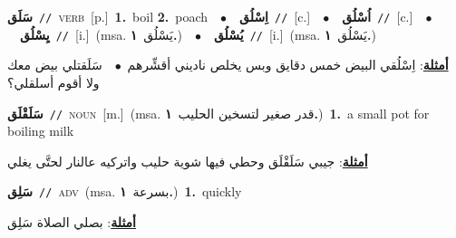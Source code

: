 \documentclass[10pt,a4paper,twoside]{article} %
\begin{document}
\begin{multicols}{2}
{\setlength\topsep{0pt}\textbf{\foreignlanguage{arabic}{سَلَق}}\ {\color{gray}\texttt{//}\color{black}}\ \textsc{verb}\ [p.]\ \textbf{1.}~boil  \textbf{2.}~poach\ \ $\bullet$\ \ \setlength\topsep{0pt}\textbf{\foreignlanguage{arabic}{اِسْلُق}}\ {\color{gray}\texttt{//}\color{black}}\ [c.]\ \ $\bullet$\ \ \setlength\topsep{0pt}\textbf{\foreignlanguage{arabic}{اُسْلُق}}\ {\color{gray}\texttt{//}\color{black}}\ [c.]\ \ $\bullet$\ \ \setlength\topsep{0pt}\textbf{\foreignlanguage{arabic}{يِسْلُق}}\ {\color{gray}\texttt{//}\color{black}}\ [i.]\ \color{gray}(msa. \foreignlanguage{arabic}{يَسْلُق}~\foreignlanguage{arabic}{\textbf{١.}})\color{black}\ \ $\bullet$\ \ \setlength\topsep{0pt}\textbf{\foreignlanguage{arabic}{يُسْلُق}}\ {\color{gray}\texttt{//}\color{black}}\ [i.]\ \color{gray}(msa. \foreignlanguage{arabic}{يَسْلُق}~\foreignlanguage{arabic}{\textbf{١.}})\color{black}\  \begin{flushright}\color{gray}\foreignlanguage{arabic}{\textbf{\underline{\foreignlanguage{arabic}{أمثلة}}}: اِسْلُقي البيض خمس دقايق وبس يخلص ناديني أقشِّرهم\ $\bullet$\ \  سَلَقتلي بيض معك ولا أقوم أسلقلي؟}\end{flushright}\color{black}} \vspace{2mm}

{\setlength\topsep{0pt}\textbf{\foreignlanguage{arabic}{سَلَقْلَق}}\ {\color{gray}\texttt{//}\color{black}}\ \textsc{noun}\ [m.]\ \color{gray}(msa. \foreignlanguage{arabic}{قدر صغير لتسخين الحليب}~\foreignlanguage{arabic}{\textbf{١.}})\color{black}\ \textbf{1.}~a small pot for boiling milk\  \begin{flushright}\color{gray}\foreignlanguage{arabic}{\textbf{\underline{\foreignlanguage{arabic}{أمثلة}}}: جيبي سَلَقْلَق وحطي فيها شوية حليب واتركيه عالنار لحتَّى يغلي}\end{flushright}\color{black}} \vspace{2mm}

{\setlength\topsep{0pt}\textbf{\foreignlanguage{arabic}{سَلِق}}\ {\color{gray}\texttt{//}\color{black}}\ \textsc{adv}\ \color{gray}(msa. \foreignlanguage{arabic}{بسرعة}~\foreignlanguage{arabic}{\textbf{١.}})\color{black}\ \textbf{1.}~quickly\  \begin{flushright}\color{gray}\foreignlanguage{arabic}{\textbf{\underline{\foreignlanguage{arabic}{أمثلة}}}: بصلي الصلاة سَلِق}\end{flushright}\color{black}} \vspace{2mm}


\end{multicols}
\end{document}
